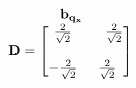 \documentclass[preview]{standalone}
\begin{document}
\begin{align*}
\begin{array}{c}\begin{matrix}\hspace{1cm} \mathbf{b_{q_x}}  \quad \hspace{0.6cm} \end{matrix} \\  \mathbf{D} = \begin{bmatrix} \frac{2}{\sqrt{2}} & \quad \frac{2}{\sqrt{2}} \\ \\-\frac{2}{\sqrt{2}} & \frac{2}{\sqrt{2}} \end{bmatrix} \end{array}
\end{align*}
\end{document}
